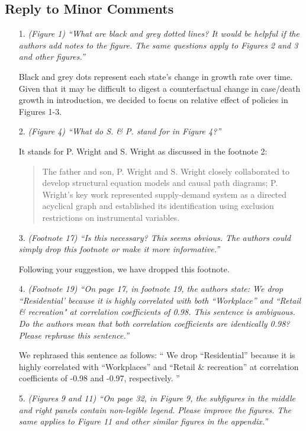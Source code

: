 \documentclass[11pt]{article}
\begin{document}
  
\subsection*{Reply to Minor Comments}
\begin{itemize}


\item[1.]  \textit{(Figure 1) ``What are black and grey dotted lines? It would be helpful if the authors add notes
to the figure. The same questions apply to Figures 2 and 3 and other figures.''}

Black and grey dots represent each state's change in growth rate over time.  Given that it may be difficult to digest a counterfactual change in case/death growth in introduction, we decided to focus on relative effect of policies in Figures 1-3. 

\item[2.]  \textit{(Figure 4) ``What do S. \& P. stand for in Figure 4?''}

It stands for 
P. Wright and S. Wright as discussed in the footnote 2:
\begin{quote}
The father and son,
P. Wright and S. Wright closely collaborated to develop structural equation models and causal path diagrams; P. Wright's
key work represented supply-demand system as a directed acyclical graph and established its identification using
exclusion restrictions on instrumental variables.
\end{quote}

\item[3.]  \textit{(Footnote 17) ``Is this necessary? This seems obvious. The authors could simply drop this
footnote or make it more informative.''}

Following your suggestion, we have dropped this footnote. 

\item[4.]  \textit{(Footnote 19) ``On page 17, in footnote 19, the authors state:
We drop ``Residential' because it is highly correlated with both ``Workplace'' and
``Retail \& recreation" at correlation coefficients of 0.98.
This sentence is ambiguous. Do the authors mean that both correlation coefficients are identically 0.98? Please rephrase this sentence.''}

We rephrased this sentence as follows: `` We drop ``Residential'' because it is highly correlated with  ``Workplaces'' and  ``Retail \& recreation''  at correlation coefficients of -0.98 and -0.97, respectively. ''

\item[5.]  \textit{(Figures 9 and 11) ``On page 32, in Figure 9, the subfigures in the middle and right panels
contain non-legible legend. Please improve the figures. The same applies to Figure 11 and
other similar figures in the appendix.''}


\end{itemize}
\end{document}

